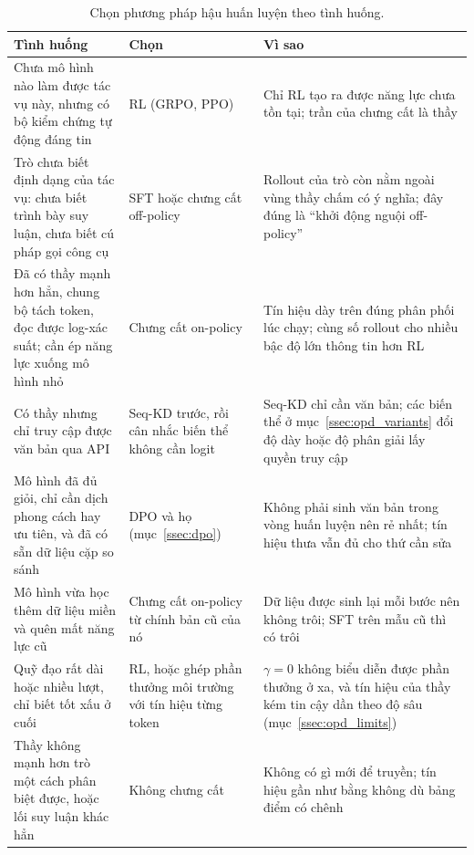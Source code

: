 \begin{table}[H]
\centering\small
\caption{Chọn phương pháp hậu huấn luyện theo tình huống.}
\label{tab:opd_decision}
\begin{tabularx}{\textwidth}{@{}>{\raggedright\arraybackslash}p{4.6cm}>{\raggedright\arraybackslash}p{2.7cm}X@{}}
\toprule
\textbf{Tình huống} & \textbf{Chọn} & \textbf{Vì sao} \\
\midrule
Chưa mô hình nào làm được tác vụ này, nhưng có bộ kiểm chứng tự động đáng tin & RL (GRPO, PPO) & Chỉ RL tạo ra được năng lực chưa tồn tại; trần của chưng cất là thầy \\
\addlinespace
Trò chưa biết định dạng của tác vụ: chưa biết trình bày suy luận, chưa biết cú pháp gọi công cụ & SFT hoặc chưng cất off-policy & Rollout của trò còn nằm ngoài vùng thầy chấm có ý nghĩa; đây đúng là ``khởi động nguội off-policy'' \\
\addlinespace
Đã có thầy mạnh hơn hẳn, chung bộ tách token, đọc được log-xác suất; cần ép năng lực xuống mô hình nhỏ & Chưng cất on-policy & Tín hiệu dày trên đúng phân phối lúc chạy; cùng số rollout cho nhiều bậc độ lớn thông tin hơn RL \\
\addlinespace
Có thầy nhưng chỉ truy cập được văn bản qua API & Seq-KD trước, rồi cân nhắc biến thể không cần logit & Seq-KD chỉ cần văn bản; các biến thể ở mục~\ref{ssec:opd_variants} đổi độ dày hoặc độ phân giải lấy quyền truy cập \\
\addlinespace
Mô hình đã đủ giỏi, chỉ cần dịch phong cách hay ưu tiên, và đã có sẵn dữ liệu cặp so sánh & DPO và họ (mục~\ref{ssec:dpo}) & Không phải sinh văn bản trong vòng huấn luyện nên rẻ nhất; tín hiệu thưa vẫn đủ cho thứ cần sửa \\
\addlinespace
Mô hình vừa học thêm dữ liệu miền và quên mất năng lực cũ & Chưng cất on-policy từ chính bản cũ của nó & Dữ liệu được sinh lại mỗi bước nên không trôi; SFT trên mẫu cũ thì có trôi \\
\addlinespace
Quỹ đạo rất dài hoặc nhiều lượt, chỉ biết tốt xấu ở cuối & RL, hoặc ghép phần thưởng môi trường với tín hiệu từng token & $\gamma=0$ không biểu diễn được phần thưởng ở xa, và tín hiệu của thầy kém tin cậy dần theo độ sâu (mục~\ref{ssec:opd_limits}) \\
\addlinespace
Thầy không mạnh hơn trò một cách phân biệt được, hoặc lối suy luận khác hẳn & Không chưng cất & Không có gì mới để truyền; tín hiệu gần như bằng không dù bảng điểm có chênh \\
\bottomrule
\end{tabularx}
\end{table}

